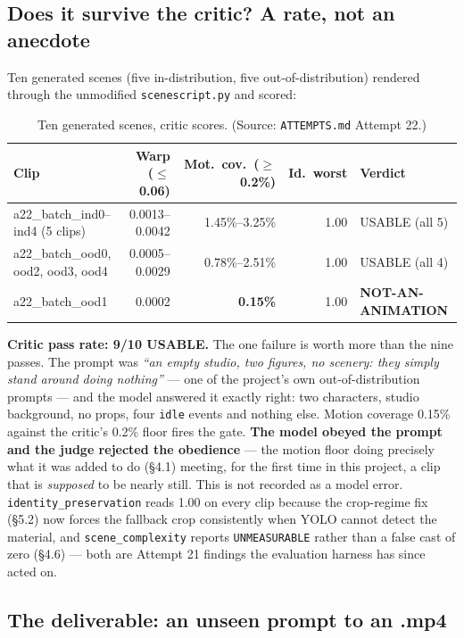 \documentclass[11pt]{article}
\newcommand{\secsym}{\S}
\begin{document}
\subsection{Does it survive the critic? A rate, not an anecdote}
\label{sec:survivecritic}

Ten generated scenes (five in-distribution, five out-of-distribution)
rendered through the unmodified \texttt{scenescript.py} and scored:

\begin{table}[h]
\centering
\caption{Ten generated scenes, critic scores. (Source: \texttt{ATTEMPTS.md} Attempt 22.)}
\label{tab:tengenerated}
\begin{tabular}{@{}L{5cm}rrrl@{}}
\toprule
Clip & Warp ($\leq$0.06) & Mot.\ cov.\ ($\geq$0.2\%) & Id.\ worst & Verdict \\
\midrule
a22\_batch\_ind0--ind4 (5 clips) & 0.0013--0.0042 & 1.45\%--3.25\% & 1.00 & USABLE (all 5) \\
a22\_batch\_ood0, ood2, ood3, ood4 & 0.0005--0.0029 & 0.78\%--2.51\% & 1.00 & USABLE (all 4) \\
a22\_batch\_ood1 & 0.0002 & \textbf{0.15\%} & 1.00 & \textbf{NOT-AN-ANIMATION} \\
\bottomrule
\end{tabular}
\end{table}

\textbf{Critic pass rate: 9/10 USABLE.} The one failure is worth more
than the nine passes. The prompt was \emph{``an empty studio, two
figures, no scenery: they simply stand around doing nothing''} --- one of
the project's own out-of-distribution prompts --- and the model answered
it exactly right: two characters, studio background, no props, four
\texttt{idle} events and nothing else. Motion coverage 0.15\% against the
critic's 0.2\% floor fires the gate. \textbf{The model obeyed the prompt
and the judge rejected the obedience} --- the motion floor doing
precisely what it was added to do (\secsym4.1) meeting, for the first
time in this project, a clip that is \emph{supposed} to be nearly still.
This is not recorded as a model error. \texttt{identity\_preservation}
reads 1.00 on every clip because the crop-regime fix (\secsym5.2) now
forces the fallback crop consistently when YOLO cannot detect the
material, and \texttt{scene\_complexity} reports \texttt{UNMEASURABLE}
rather than a false cast of zero (\secsym4.6) --- both are Attempt 21
findings the evaluation harness has since acted on.

\subsection{The deliverable: an unseen prompt to an .mp4}
\label{sec:deliverable-a22}
\end{document}
